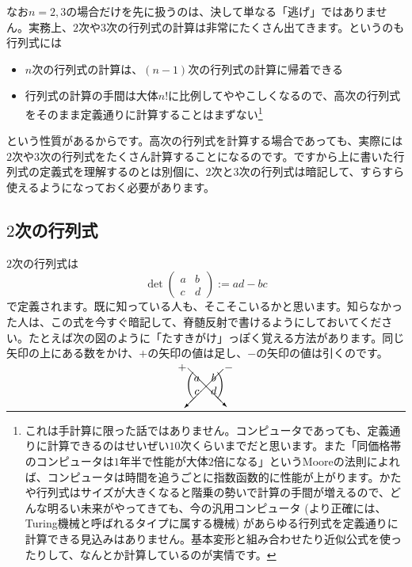 なお$n = 2, 3$の場合だけを先に扱うのは、決して単なる「逃げ」ではありません。実務上、$2$次や$3$次の行列式の計算は非常にたくさん出てきます。というのも行列式には
\begin{itemize}
\item $n$次の行列式の計算は、$(n - 1)$次の行列式の計算に帰着できる
\item 行列式の計算の手間は大体$n!$に比例してややこしくなるので、高次の行列式をそのまま定義通りに計算することはまずない\footnote{これは手計算に限った話ではありません。コンピュータであっても、定義通りに計算できるのはせいぜい$10$次くらいまでだと思います。また「同価格帯のコンピュータは$1$年半で性能が大体$2$倍になる」というMooreの法則によれば、コンピュータは時間を追うごとに指数函数的に性能が上がります。かたや行列式はサイズが大きくなると階乗の勢いで計算の手間が増えるので、どんな明るい未来がやってきても、今の汎用コンピュータ (より正確には、Turing機械と呼ばれるタイプに属する機械) があらゆる行列式を定義通りに計算できる見込みはありません。基本変形と組み合わせたり近似公式を使ったりして、なんとか計算しているのが実情です。}
\end{itemize}
という性質があるからです。高次の行列式を計算する場合であっても、実際には$2$次や$3$次の行列式をたくさん計算することになるのです。ですから上に書いた行列式の定義式を理解するのとは別個に、$2$次と$3$次の行列式は暗記して、すらすら使えるようになっておく必要があります。

\subsection{$2$次の行列式}

$2$次の行列式は
\[
\det
\begin{pmatrix}
a & b \\
c & d
\end{pmatrix}
:= ad-bc
\]
で定義されます。既に知っている人も、そこそこいるかと思います。知らなかった人は、この式を今すぐ暗記して、脊髄反射で書けるようにしておいてください。たとえば次の図のように「たすきがけ」っぽく覚える方法があります。同じ矢印の上にある数をかけ、$+$の矢印の値は足し、$-$の矢印の値は引くのです。

\begin{figure}[h!tbp]
\[
\begin{pmatrix}
a & b \\
c & d \\
\end{pmatrix}
\begin{picture}(0, 0)
\put(-35, 18){\vector(1, -1){35}}
\put(-3, 17){\vector(-1, -1){35}}
\put(-44, 16){$+$}
\put(-2, 16){$-$}
\end{picture}
\]
\end{figure}

